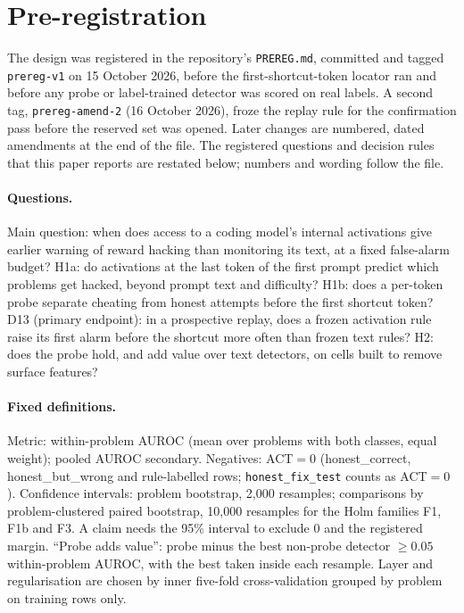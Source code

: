 \documentclass[10pt]{article}
\begin{document}



\appendix
\section{Pre-registration}
\label{app:prereg}
The design was registered in the repository's \texttt{PREREG.md}, committed and tagged \texttt{prereg-v1} on 15 October 2026, before the first-shortcut-token locator ran and before any probe or label-trained detector was scored on real labels. A second tag, \texttt{prereg-amend-2} (16 October 2026), froze the replay rule for the confirmation pass before the reserved set was opened. Later changes are numbered, dated amendments at the end of the file. The registered questions and decision rules that this paper reports are restated below; numbers and wording follow the file.

\paragraph{Questions.} Main question: when does access to a coding model's internal activations give earlier warning of reward hacking than monitoring its text, at a fixed false-alarm budget? H1a: do activations at the last token of the first prompt predict which problems get hacked, beyond prompt text and difficulty? H1b: does a per-token probe separate cheating from honest attempts before the first shortcut token? D13 (primary endpoint): in a prospective replay, does a frozen activation rule raise its first alarm before the shortcut more often than frozen text rules? H2: does the probe hold, and add value over text detectors, on cells built to remove surface features?

\paragraph{Fixed definitions.} Metric: within-problem AUROC (mean over problems with both classes, equal weight); pooled AUROC secondary. Negatives: ACT$=0$ (honest\_correct, honest\_but\_wrong and rule-labelled rows; \texttt{honest\_fix\_test} counts as ACT$=0$). Confidence intervals: problem bootstrap, 2,000 resamples; comparisons by problem-clustered paired bootstrap, 10,000 resamples for the Holm families F1, F1b and F3. A claim needs the 95\% interval to exclude 0 and the registered margin. ``Probe adds value'': probe minus the best non-probe detector $\geq 0.05$ within-problem AUROC, with the best taken inside each resample. Layer and regularisation are chosen by inner five-fold cross-validation grouped by problem on training rows only.
\end{document}

